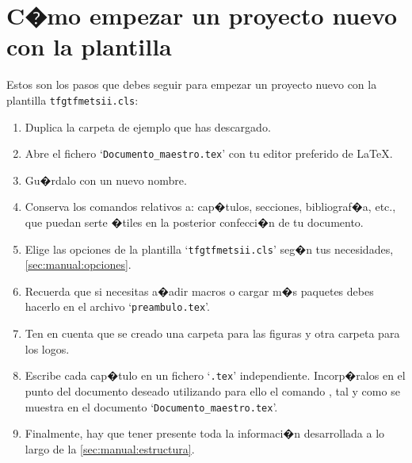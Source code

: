 
\section{C�mo empezar un proyecto nuevo con la plantilla}
\label{sec:manual:proyectoNuevo}

Estos son los pasos que debes seguir para empezar un proyecto nuevo con la plantilla \linebreak \texttt{tfgtfmetsii.cls}:

\begin{enumerate}

	\item Duplica la carpeta de ejemplo que has descargado.
    \item Abre el fichero `\verb'Documento_maestro.tex'' con tu editor preferido de \LaTeX.
    \item Gu�rdalo con un nuevo nombre.
    \item Conserva los comandos relativos a: cap�tulos, secciones, bibliograf�a, etc., que puedan serte �tiles en la posterior confecci�n de tu documento.
    \item Elige las opciones de la plantilla `\texttt{tfgtfmetsii.cls}' seg�n tus necesidades, \autoref{sec:manual:opciones}.
        
    \item Recuerda que si necesitas a�adir macros o cargar m�s paquetes debes hacerlo en el archivo `\texttt{preambulo.tex}'. 
    
    \item Ten en cuenta que se creado una carpeta para las figuras y otra carpeta para los logos.
        
    \item Escribe cada cap�tulo en un fichero `\verb'.tex'' independiente. Incorp�ralos en el punto del documento deseado utilizando para ello el comando \verb'', tal y como se muestra en el documento `\verb'Documento_maestro.tex''.
         
    \item Finalmente, hay que tener presente toda la informaci�n desarrollada a lo largo de la  \autoref{sec:manual:estructura}.

\end{enumerate}


